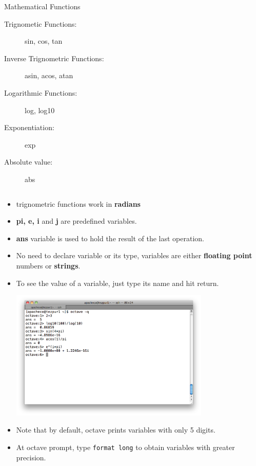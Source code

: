 \documentclass[slidestop,mathserif,compress,xcolor=svgnames]{beamer}
\newenvironment{eblock}[0]
{
\begin{beamerboxesrounded}[upper=uppercol2,lower=lowercol2,shadow=true]}
{\end{beamerboxesrounded}}
\begin{document}
\begin{frame}[allowframebreaks]
\begin{columns}
\begin{eblock}{Mathematical Functions}
\begin{description}
        \item[Trignometic Functions:] sin, cos, tan
        \item[Inverse Trignometric Functions:] asin, acos, atan
        \item[Logarithmic Functions:] log, log10
        \item[Exponentiation:] exp
        \item[Absolute value:] abs
      \end{description}
    \end{eblock}
  \end{columns}
  \begin{itemize}
    \item trignometric functions work in \textbf{radians}
    \item \textbf{pi, e, i} and \textbf{j} are predefined variables.
    \item \textbf{ans} variable is used to hold the result of the last operation.
    \item No need to declare variable or its type, variables are either \textbf{floating point} numbers or \textbf{strings}.
    \item To see the value of a variable, just type its name and hit return.
    \begin{center}
      \includegraphics[width=0.75\textwidth,clip=true]{octave-simple}
    \end{center}
    \item Note that by default, octave prints variables with only 5 digits.
    \item At octave prompt, type \texttt{format long} to obtain variables with greater precision.
  \end{itemize}
\end{frame}
\end{document}
